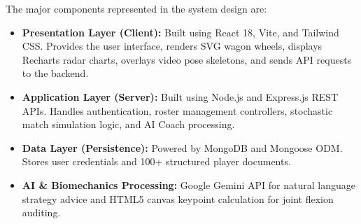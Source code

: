 The major components represented in the system design are:
\begin{itemize}
    \item \textbf{Presentation Layer (Client):} Built using React 18, Vite, and Tailwind CSS. Provides the user interface, renders SVG wagon wheels, displays Recharts radar charts, overlays video pose skeletons, and sends API requests to the backend.
    \item \textbf{Application Layer (Server):} Built using Node.js and Express.js REST APIs. Handles authentication, roster management controllers, stochastic match simulation logic, and AI Coach processing.
    \item \textbf{Data Layer (Persistence):} Powered by MongoDB and Mongoose ODM. Stores user credentials and 100+ structured player documents.
    \item \textbf{AI \& Biomechanics Processing:} Google Gemini API for natural language strategy advice and HTML5 canvas keypoint calculation for joint flexion auditing.
\end{itemize}

